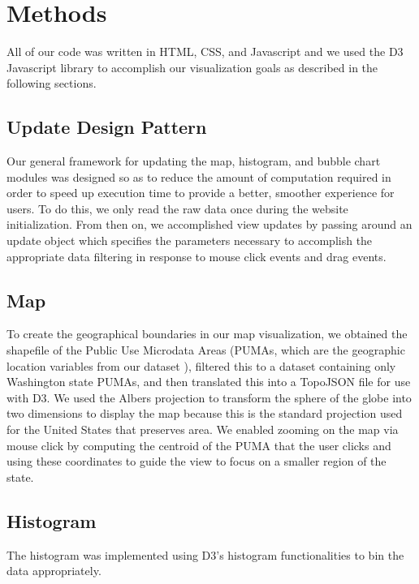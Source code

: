 \documentclass{sigchi}
\begin{document}
\section{Methods}

All of our code was written in HTML, CSS, and Javascript and we used the D3 Javascript library to accomplish our visualization goals as described in the following sections.

\subsection{Update Design Pattern}
Our general framework for updating the map, histogram, and bubble chart modules was designed so as to reduce the amount of computation required in order to speed up execution time to provide a better, smoother experience for users. To do this, we only read the raw data once during the website initialization. From then on, we accomplished view updates by passing around an update object which specifies the parameters necessary to accomplish the appropriate data filtering in response to mouse click events and drag events. 

\subsection{Map}
To create the geographical boundaries in our map visualization, we obtained the shapefile of the Public Use Microdata Areas (PUMAs, which are the geographic location variables from our dataset \cite{pums}), filtered this to a dataset containing only Washington state PUMAs, and then translated this into a TopoJSON file for use with D3. We used the Albers projection to transform the sphere of the globe into two dimensions to display the map because this is the standard projection used for the United States that preserves area. We enabled zooming on the map via mouse click by computing the centroid of the PUMA that the user clicks and using these coordinates to guide the view to focus on a smaller region of the state. 

\subsection{Histogram}
The histogram was implemented using D3's histogram functionalities to bin the data appropriately.
\end{document}

